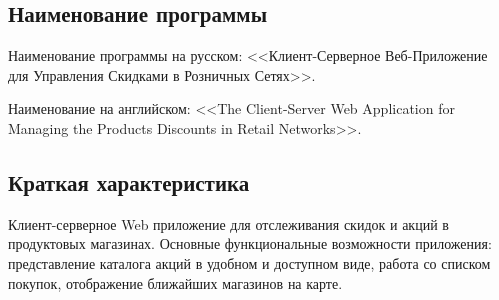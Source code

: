 \subsection{Наименование программы}
\tab[0.75cm]Наименование программы на русском: <<Клиент-Серверное Веб-Приложение для Управления Скидками в Розничных Сетях>>.

Наименование на английском: <<The Client-Server Web Application for Managing
the Products Discounts in Retail Networks>>. \\


\subsection{Краткая характеристика}
\tab[0.75cm]
Клиент-серверное Web приложение для отслеживания скидок и акций в продуктовых магазинах.
Основные функциональные возможности приложения: представление каталога акций в
удобном и доступном виде, работа со списком покупок, отображение ближайших
магазинов на карте.

